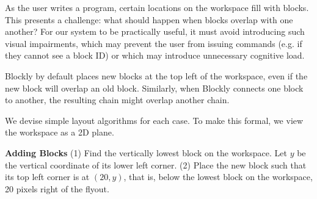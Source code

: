 \documentclass[]{article}
\begin{document}

As the user writes a program, certain locations on the workspace fill with blocks.
This presents a challenge: what should happen when blocks overlap with one another?
For our system to be practically useful, it must avoid introducing such visual impairments,
which may prevent the user from issuing commands (e.g. if they cannot see a block ID)
or which may introduce unnecessary cognitive load.

Blockly by default places new blocks at the top left of the workspace, even if the new block
will overlap an old block. Similarly, when Blockly connects one block to another, the resulting chain
might overlap another chain.

We devise simple layout algorithms for each case. To make this formal, we view
the workspace as a 2D plane.


\textbf{Adding Blocks} (1) Find the vertically lowest block on the workspace.
Let $y$ be the vertical coordinate of its lower left corner. (2) Place the new block
such that its top left corner is at $(20, y)$, that is, below the lowest block on the
workspace, 20 pixels right of the flyout.
\end{document}
